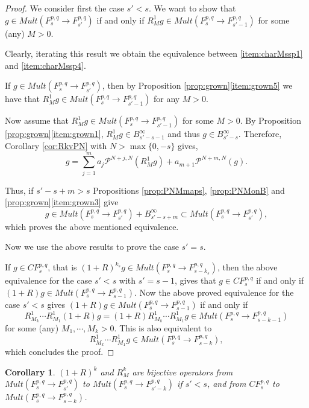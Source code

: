 \documentclass[12pt,twoside,leqno,final]{amsart}
\theoremstyle{plain}
\newtheorem{cor}[thm]{Corollary}
\begin{document}
\begin{proof} We consider first the case $s'<s$. 
We want to show that $g\in Mult(F^{p,q}_s\to F^{p,q}_{ s'})$ 
if and only if $R^1_M g\in  Mult(F^{p,q}_s\to F^{p,q}_{ s'-1})$ for some (any) $M>0$.

Clearly, iterating this result we obtain the equivalence between \eqref{item:charMssp1} and \eqref{item:charMssp4}.

If $g\in Mult(F^{p,q}_s\to F^{p,q}_{ s'})$, then  
by Proposition \ref{prop:grown}\eqref{item:grown5} we have that  $R^1_M g\in  Mult(F^{p,q}_s\to F^{p,q}_{ s'-1})$ for any $M>0$.

Now assume that $R^1_M g\in  Mult(F^{p,q}_s\to F^{p,q}_{ s'-1})$ for some $M>0$. 
By Proposition \ref{prop:grown}\eqref{item:grown1}, 
$R^1_M g\in B^\infty_{ s'-s-1}$ and thus $g\in B^\infty_{ s'-s}$.    
Therefore, Corollary \ref{cor:RkvPN} with $N>\max\{0,-s\}$  gives,
$$
g=\sum_{j=1}^m a_j{{\mathcal P}}^{N+j,N}(R^1_M g)+a_{m+1}{{\mathcal P}}^{N+m,N}(g).
$$
 
Thus, if $s'-s+m>s$ Propositions \ref{prop:PNMmaps}, \ref{prop:PNMonB} and \ref{prop:grown}\eqref{item:grown3} give  
 $$
 g\in Mult(F^{p,q}_s\to F^{p,q}_{ s'})+B^\infty_{ s'-s+m}
 \subset Mult(F^{p,q}_s\to F^{p,q}_{ s'}),
 $$ 
which proves the above mentioned equivalence.

Now we use the above results to prove the case $s'=s$. 

If $g\in CF^{p,q}_s$, that is $(1+R)^{k_s}g\in Mult(F^{p,q}_s\to F^{p,q}_{s-k_s})$, 
then the above  equivalence for the case $s'<s$ with $s'=s-1$, gives that $g\in CF^{p,q}_s$ 
if and only if $(1+R)g\in Mult(F^{p,q}_s\to F^{p,q}_{s-1})$.
Now the above proved equivalence for the case $s'<s$  gives 
$(1+R)g\in Mult(F^{p,q}_s\to F^{p,q}_{s-1})$
if and only if
$$ 
R^1_{M_k}\cdots R^1_{M_1}(1+R) g=(1+R)R^1_{M_k}\cdots R^1_{M_1}g\in  Mult(F^{p,q}_s\to F^{p,q}_{s-k-1})
$$
 for some (any) $M_1,\cdots,M_k>0$. This is also equivalent to 
$$
R^1_{M_k}\cdots R^1_{M_1}g\in  Mult(F^{p,q}_s\to F^{p,q}_{s-k}),
$$
which concludes the proof.
\end{proof}

\begin{cor}
$(1+R)^k$ and $R^k_M$ are bijective operators from $Mult(F^{p,q}_s\to F^{p,q}_{s'})$ 
to $Mult(F^{p,q}_s\to F^{p,q}_{s'-k})$ if $s'<s$, and from $CF^{p,q}_s$ to $Mult(F^{p,q}_s\to F^{p,q}_{s-k})$.
\end{cor}

 
\end{document}
